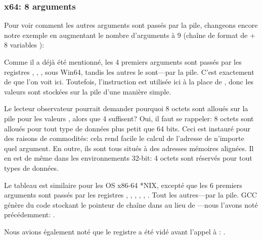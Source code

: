\subsubsection{x64: 8 arguments}

\label{example_printf8_x64}
Pour voir comment les autres arguments sont passés par la pile, changeons encore
notre exemple en augmentant le nombre d'arguments à 9 (chaîne de format de
\printf + 8 variables \Tint):




Comme il a déjà été mentionné, les 4 premiers arguments sont passés par les registres
\RCX, \RDX, ,  sous Win64, tandis les autres le sont---par la pile.
C'est exactement de que l'on voit ici.
Toutefois, l'instruction \MOV est utilisée ici à la place de \PUSH, donc les valeurs
sont stockées sur la pile d'une manière simple.



Le lecteur observateur pourrait demander pourquoi 8 octets sont alloués sur la
pile pour les valeurs \Tint, alors que 4 suffisent?
Oui, il faut se rappeler: 8 octets sont alloués pour tout type de données plus
petit que 64 bits.
Ceci est instauré pour des raisons de commodités: cela rend facile le calcul
de l'adresse de n'importe quel argument.
En outre, ils sont tous situés à des adresses mémoires alignées.
Il en est de même dans les environnements 32-bit: 4 octets sont réservés pour tout
types de données.



Le tableau est similaire pour les OS x86-64 *NIX, excepté que les 6 premiers arguments
sont passés par les registres \RDI, \RSI, \RDX, \RCX, , .
Tout les autres---par la pile.
GCC génère du code stockant le pointeur de chaîne dans \EDI au lieu de \RDI{}---nous
l'avons noté précédemment:
.

Nous avions également noté que le registre \EAX a été vidé avant l'appel à
\printf: .




